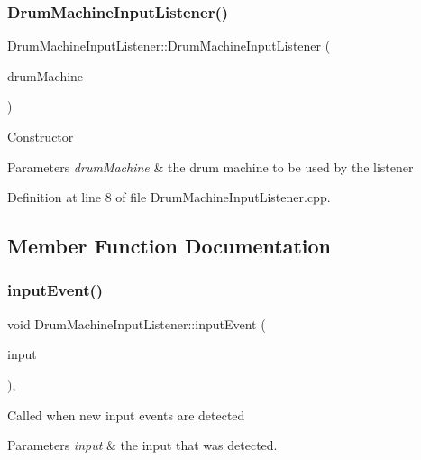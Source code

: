 \subsubsection{\texorpdfstring{Drum\+Machine\+Input\+Listener()}{DrumMachineInputListener()}}
{\footnotesize\ttfamily Drum\+Machine\+Input\+Listener\+::\+Drum\+Machine\+Input\+Listener (\begin{DoxyParamCaption}\item[{\hyperlink{class_drum_machine}{Drum\+Machine} \&}]{drum\+Machine }\end{DoxyParamCaption})\hspace{0.3cm}{\ttfamily [explicit]}}

Constructor 
\begin{DoxyParams}{Parameters}
{\em drum\+Machine} & the drum machine to be used by the listener \\
\hline
\end{DoxyParams}


Definition at line 8 of file Drum\+Machine\+Input\+Listener.\+cpp.



\subsection{Member Function Documentation}
\mbox{\label{class_drum_machine_input_listener_a44a620b09b35885a26befe84fa6e1ab0}} 
\subsubsection{\texorpdfstring{input\+Event()}{inputEvent()}}
{\footnotesize\ttfamily void Drum\+Machine\+Input\+Listener\+::input\+Event (\begin{DoxyParamCaption}\item[{unsigned short}]{input }\end{DoxyParamCaption})\hspace{0.3cm}{\ttfamily [override]}, {\ttfamily [virtual]}}

Called when new input events are detected 
\begin{DoxyParams}{Parameters}
{\em input} & the input that was detected. \\
\hline
\end{DoxyParams}


